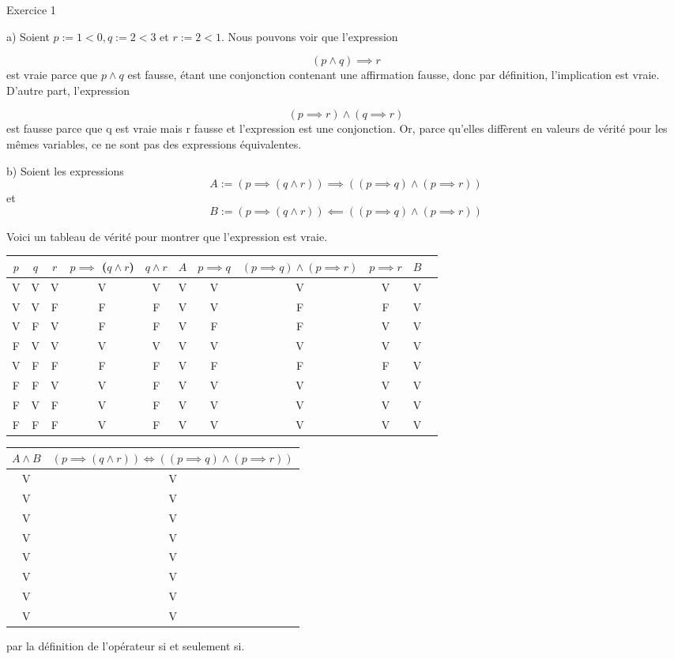 \documentclass{article}
\begin{document}
Exercice 1

\vspace{0.5cm}

a) Soient $p := 1 < 0, q := 2 < 3$ et $r := 2 < 1$.
Nous pouvons voir que l'expression 

$$(p \land q) \implies r$$
est vraie parce que $p \land q$ est fausse, étant une conjonction contenant une affirmation fausse, donc par définition, l'implication est vraie. D'autre part, l'expression 

$$ (p \implies r) \land (q \implies r)$$
est fausse parce que q est vraie mais r fausse et l'expression est une conjonction. Or, parce qu'elles diffèrent en valeurs de vérité pour les mêmes variables, ce ne sont pas des expressions équivalentes.

\vspace{0.5cm}

b) Soient les expressions $$A:= (p \implies (q \land r)) \implies ((p \implies q) \land (p \implies r))$$ et
$$B := (p \implies (q \land r)) \impliedby ((p \implies q) \land (p \implies r))$$

Voici un tableau de vérité pour montrer que l'expression est vraie.

\begin{center}
\begin{tabular}{| c | c | c | c | c | c | c | c | c | c | c |}
\hline
$p$ & $q$ & $r$ & $p \implies$ ($q \land r$) & $q \land r$ & $ A $& $p \implies q  $ & $ (p \implies q) \land (p \implies r) $ & $p \implies r $ & $ B $\\
\hline
V & V & V & V & V & V & V & V & V & V\\
V & V & F & F & F & V & V & F & F & V\\
V & F & V & F & F & V & F & F & V & V\\
F & V & V & V & V & V & V & V & V & V\\
V & F & F & F & F & V & F & F & F & V\\
F & F & V & V & F & V & V & V & V & V\\
F & V & F & V & F & V & V & V & V & V\\
F & F & F & V & F & V & V & V & V & V\\
\hline
\end{tabular}
\end{center}

\begin{center}
\begin{tabular}{| c | c |}
\hline
$ A \land B$ & $(p \implies (q \land r)) \iff ((p \implies q) \land (p \implies r))$\\
\hline
V & V \\
V & V \\
V & V \\
V & V \\
V & V \\
V & V \\
V & V \\
V & V \\
\hline
\end{tabular}
\end{center}

par la définition de l’opérateur si et seulement si.
\end{document}
